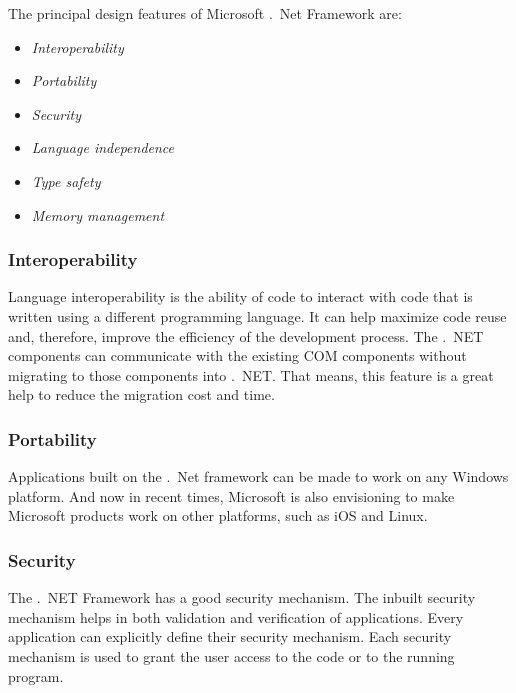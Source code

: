 The principal design features of Microsoft .\ Net Framework are:
\begin{multicols}{2}
\begin{itemize}
	\item \textit{Interoperability}
	\item \textit{Portability}
	\item \textit{Security}
	\item \textit{Language independence}
	\item \textit{Type safety}
	\item \textit{Memory management}
\end{itemize}
\end{multicols}


\subsubsection*{Interoperability}
Language interoperability is the ability of code to interact with code that is written using a different programming language. It can help maximize code reuse and, therefore, improve the efficiency of the development process. The .\ NET components can communicate with the existing COM components without migrating to those components into .\ NET. That means, this feature is a great help to reduce the migration cost and time. 

\subsubsection*{Portability}
 Applications built on the .\ Net framework can be made to work on any Windows platform. And now in recent times, Microsoft is also envisioning to make Microsoft products work on other platforms, such as iOS and Linux.
 
 \subsubsection*{Security}
  The .\ NET Framework has a good security mechanism. The inbuilt security mechanism helps in both validation and verification of applications. Every application can explicitly define their security mechanism. Each security mechanism is used to grant the user access to the code or to the running program.
  
  
